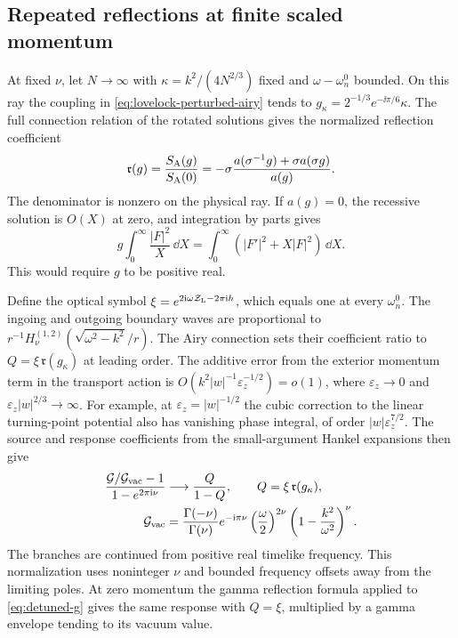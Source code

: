 \subsection{Repeated reflections at finite scaled momentum}
\label{sec:lovelock-scaled-momentum}

At fixed \(\nu\), let \(N\to\infty\) with
\(\kappa=k^2/(4N^{2/3})\) fixed and
\(\omega-\omega_n^0\) bounded. On this ray the coupling in
\eqref{eq:lovelock-perturbed-airy} tends to
\(g_\kappa=2^{-1/3}e^{-\ii\pi/6}\kappa\). The full connection
relation of the rotated solutions gives the normalized reflection
coefficient
\begin{equation}
 \mathfrak r(g)=\frac{S_{\rm A}(g)}{S_{\rm A}(0)}
 =-\sigma\frac{a(\sigma^{-1}g)+\sigma a(\sigma g)}{a(g)}.
 \label{eq:lovelock-scaled-reflection}
\end{equation}
The denominator is nonzero on the physical ray. If \(a(g)=0\),
the recessive solution is \(O(X)\) at zero, and integration by parts
gives
\begin{equation}
 g\int_0^\infty\frac{|F|^2}{X}\,\dd X
  =\int_0^\infty (|F'|^2+X|F|^2)\,\dd X .
\end{equation}
This would require \(g\) to be positive real.

Define the optical symbol
\(\xi=e^{2\mathrm{i}\omega\mathcal Z_{\rm L}-2\pi\mathrm{i} h}\), which equals one
at every \(\omega_n^0\). The ingoing and outgoing boundary waves are
proportional to
\(r^{-1}H_\nu^{(1,2)}(\sqrt{\omega^2-k^2}/r)\).
The Airy connection sets their coefficient ratio to
\(Q=\xi\,\mathfrak r(g_\kappa)\) at leading order. The additive
error from the exterior momentum term in the transport action is
\(O(k^2|w|^{-1}\varepsilon_z^{-1/2})=o(1)\), where
\(\varepsilon_z\to0\) and \(\varepsilon_z|w|^{2/3}\to\infty\).
For example, at \(\varepsilon_z=|w|^{-1/2}\) the cubic correction
to the linear turning-point potential also has vanishing phase
integral, of order \(|w|\varepsilon_z^{7/2}\).
The source and response coefficients from the small-argument
Hankel expansions then give \cite{Valach:2026,Jia:2026}
\begin{align}
 \frac{\mathcal G/\mathcal G_{\rm vac}-1}{1-e^{2\pi\mathrm{i}\nu}}
 &\longrightarrow \frac{Q}{1-Q},\qquad Q=\xi\,\mathfrak r(g_\kappa),
 \notag\\
 \mathcal G_{\rm vac} &=
 \frac{\Gamma(-\nu)}{\Gamma(\nu)}e^{-\mathrm{i}\pi\nu}
 \left(\frac{\omega}{2}\right)^{2\nu}
 \left(1-\frac{k^2}{\omega^2}\right)^\nu .
 \label{eq:lovelock-scaled-transfer}
\end{align}
The branches are continued from positive real timelike frequency.
This normalization uses noninteger \(\nu\) and bounded frequency
offsets away from the limiting poles. At zero momentum the gamma
reflection formula applied to \eqref{eq:detuned-g} gives the
same response with \(Q=\xi\), multiplied by a gamma envelope
tending to its vacuum value.

